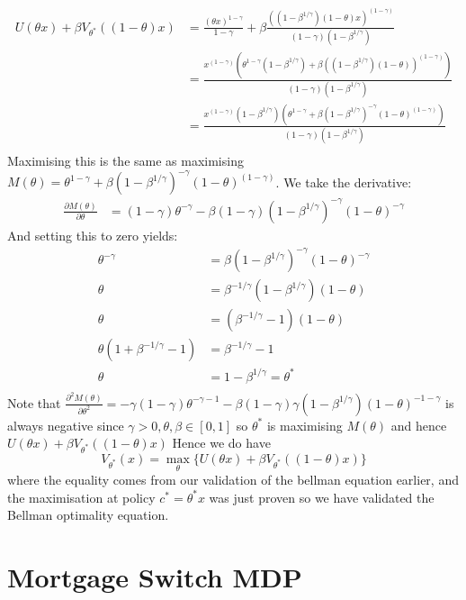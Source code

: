\documentclass{article}[12pt]
\begin{document}
\begin{align*}
U(\theta x) + \beta V_{\theta^*}((1-\theta)x) &= \frac{(\theta x)^{1-\gamma}}{1-\gamma} + \beta\frac{((1 - \beta^{1/\gamma}) (1-\theta)x)^{(1-\gamma)}}{(1-\gamma)(1-\beta^{1/\gamma})}\\
 &= \frac{x^{(1-\gamma)}(\theta^{1-\gamma}(1-\beta^{1/\gamma}) +\beta((1 - \beta^{1/\gamma}) (1-\theta))^{(1-\gamma)})}{(1-\gamma)(1-\beta^{1/\gamma})}\\
  &= \frac{x^{(1-\gamma)}(1-\beta^{1/\gamma})(\theta^{1-\gamma} +\beta(1 - \beta^{1/\gamma})^{-\gamma} (1-\theta)^{(1-\gamma)})}{(1-\gamma)(1-\beta^{1/\gamma})}\\
\end{align*}
Maximising this is the same as maximising $M(\theta) = \theta^{1-\gamma} +\beta(1 - \beta^{1/\gamma})^{-\gamma} (1-\theta)^{(1-\gamma)}$. We take the derivative:
\begin{align*}
\frac{\partial M(\theta)}{\partial \theta} &= (1-\gamma)\theta^{-\gamma} - \beta(1-\gamma)(1 - \beta^{1/\gamma})^{-\gamma}(1-\theta)^{-\gamma}
\end{align*}
And setting this to zero yields:
\begin{align*}
\theta^{-\gamma} &= \beta(1 - \beta^{1/\gamma})^{-\gamma}(1-\theta)^{-\gamma}\\
\theta&= \beta^{-1/\gamma}(1 - \beta^{1/\gamma})(1-\theta)\\
\theta&=( \beta^{-1/\gamma} - 1)(1-\theta)\\
\theta(1+ \beta^{-1/\gamma} - 1)&=\beta^{-1/\gamma} - 1\\
\theta&=1- \beta^{1/\gamma} = \theta^*\\
\end{align*}
Note that $\frac{\partial^2 M(\theta)}{\partial \theta^2} = -\gamma (1-\gamma)\theta^{-\gamma-1} - \beta(1-\gamma)\gamma (1-\beta^{1/\gamma})(1-\theta)^{-1-\gamma}$ is always negative since $\gamma>0, \theta,\beta \in [0,1]$ so $\theta^*$ is maximising $M(\theta)$ and hence $U(\theta x) + \beta V_{\theta^*}((1-\theta)x)$
Hence we do have
$$V_{\theta^*}(x) = \max_\theta\{ U(\theta x) + \beta V_{\theta^*}((1-\theta)x) \} $$
where the equality comes from our validation of the bellman equation earlier, and the maximisation at policy $c^* = \theta^*x$ was just proven so we have validated the Bellman optimality equation.

\section{Mortgage Switch MDP}
\end{document}
